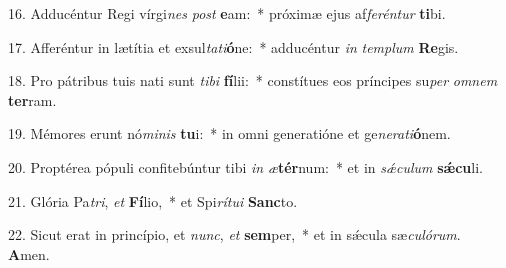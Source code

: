 16. Adducéntur Regi vírgi\textit{nes} \textit{post} \textbf{e}am:~*  próximæ ejus af\textit{fe}\textit{rén}\textit{tur} \textbf{ti}bi.\

17. Afferéntur in lætítia et exsul\textit{ta}\textit{ti}\textbf{ó}ne:~*  adducéntur \textit{in} \textit{tem}\textit{plum} \textbf{Re}gis.\

18. Pro pátribus tuis nati sunt \textit{ti}\textit{bi} \textbf{fí}lii:~*  constítues eos príncipes su\textit{per} \textit{om}\textit{nem} \textbf{ter}ram.\

19. Mémores erunt nó\textit{mi}\textit{nis} \textbf{tu}i:~*  in omni generatióne et ge\textit{ne}\textit{ra}\textit{ti}\textbf{ó}nem.\

20. Proptérea pópuli confitebúntur tibi \textit{in} \textit{æ}\textbf{tér}num:~*  et in \textit{sǽ}\textit{cu}\textit{lum} \textbf{sǽ}\textbf{cu}li.\

21. Glória Pa\textit{tri}, \textit{et} \textbf{Fí}lio,~*  et Spi\textit{rí}\textit{tu}\textit{i} \textbf{Sanc}to.\

22. Sicut erat in princípio, et \textit{nunc}, \textit{et} \textbf{sem}per,~*  et in sǽcula sæ\textit{cu}\textit{ló}\textit{rum}. \textbf{A}men.\

